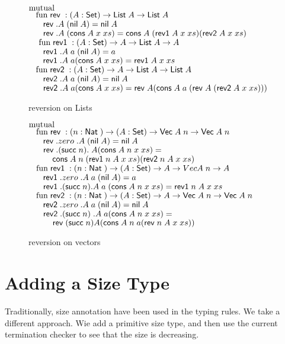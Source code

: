 \begin{figure}
$\mathrm{mutual}\; $  \\
$ \hspace*{3mm} \mathrm{fun}\; \mathsf{rev}\; : ( A : \mathsf{Set} ) \rightarrow{\mathsf{List}\;A \rightarrow\mathsf{List}\;A} $ \\
$ \spc \spc \rev .A \; (\nil A ) = \nil A$\\
$ \spc \spc \rev .A \; (\cons A \;x  \; xs) = \cons A \; (\reva A \; x \; xs) (\revb A \; x \; xs)$\\
$\ \hspace*{3mm} \mathrm{fun}\; \mathsf{rev1}\; : ( A  : \mathsf{Set} ) \rightarrow{A  \rightarrow\mathsf{List}\;A \rightarrow A}$\\
$ \spc \spc \reva .A \; a \; (\nil A ) = a$ \\
$\spc \spc \reva .A \; a (\cons A \; x \; xs) = \reva A \; x \; xs$\\
$\hspace*{3mm} \mathrm{fun}\; \mathsf{rev2}\; : ( A : \mathsf{Set} ) \rightarrow{ A \rightarrow\mathsf{List}\;A \rightarrow\mathsf{List}\;A} $\\
$\spc \spc \revb .A \; a \; (\nil A ) = \nil A $\\
$\spc \spc \revb .A \; a (\cons A\;  x \; xs) = \rev A (\cons A \; a \; (\rev A \; (\revb A \; x \; xs)))$

\caption{reversion on Lists}  
\end{figure}
\begin{figure} 
$\mathrm{mutual}\; $ \\
$\hspace*{3mm} \mathrm{fun}\; \mathsf{rev}\; : ( n : \mathsf{Nat}\;  ) \rightarrow{( A : \mathsf{Set}) \rightarrow{\mathsf{Vec}\;A \; n \rightarrow\mathsf{Vec}\;A \; n}}$\\
$\spc \spc \rev .zero \; .A  \; (\nil A) = \nil A $\\
$\spc \spc \rev .(\suc n) .\; A (\cons A \; n \; x \; xs) = $\\
$\spcx \cons A \; n \; (\reva n \; A \; x \; xs) (\revb n \; A \; x \; xs) $ \\
$\hspace*{3mm} \mathrm{fun}\; \mathsf{rev1}\; : ( n : \mathsf{Nat}\; ) \rightarrow( A : \mathsf{Set} ) \rightarrow{A \rightarrow Vec A \; n \rightarrow A}$\\
$\spc \spc \reva .zero  \; .A \; a \; (\nil A) = a $\\
$\spc \spc \reva .(\suc n) .A \; a \; (\cons A \; n \; x \; xs) = \reva n \; A \; x \; xs $\\
$\hspace*{3mm} \mathrm{fun}\; \mathsf{rev2}\; : ( n : \mathsf{Nat}\; ) \rightarrow{( A : \mathsf{Set}) \rightarrow{A \rightarrow\mathsf{Vec}\;A \; n \rightarrow\mathsf{Vec}\;A \; n}}$\\
$ \spc \spc \revb .zero \; .A  \; a \; (\nil A) = \nil A $\\
$ \spc \spc \revb .(\suc n) \; .A \; a (\cons A \; n \; x \; xs) = $\\
$ \spcx \rev (\suc n) A (\cons A \; n \; a (\rev n \; A \; x \; xs))$
\caption{reversion on vectors}  
\end{figure}  

\chapter{Adding a Size Type}
Traditionally, size annotation have been used in the typing rules.
We take a different approach.
Wie add a primitive size type, and then use the current termination checker to see that the size is 
decreasing.
